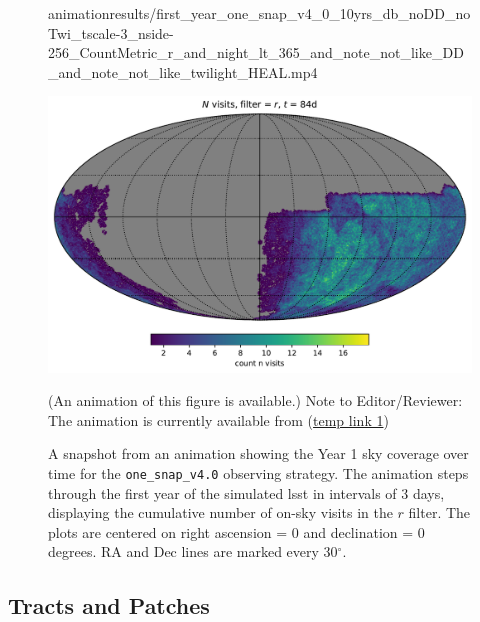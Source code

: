 \documentclass[preprintm,linenumbers]{aastex631}
\newcommand{\baseline}{\texttt{one\_snap\_v4.0}\xspace}
\begin{document}
 		
		\begin{figure}
			\begin{center}
				\begin{interactive}{animation}{results/first_year_one_snap_v4_0_10yrs_db_noDD_noTwi_tscale-3_nside-256_CountMetric_r_and_night_lt_365_and_note_not_like_DD_and_note_not_like_twilight_HEAL.mp4}
				\end{interactive}
				\includegraphics[width=0.5\columnwidth]{results/first_year_one_snap_v4_0_10yrs_db_noDD_noTwi_tscale-3_nside-256_CountMetric_r_and_night_lt_84_and_scheduler_note_not_like_DD_and_scheduler_note_not_like_twilight_HEAL.pdf}
				\caption{A snapshot from an animation showing the Year 1 sky coverage over time for the \baseline observing strategy. 
    The animation steps through the first year of the simulated \gls*{lsst} in intervals of 3 days, displaying the cumulative number of on-sky visits in the $r$ filter. 
    The plots are centered on right ascension = 0 and declination = 0 degrees. RA and Dec lines are marked every 30$^\circ$.} (An animation of this figure is available.)  Note to Editor/Reviewer: The animation is currently available from (\href{https://uoe-my.sharepoint.com/:v:/g/personal/jrobin10_ed_ac_uk/Ef0X-FVuKAhNtJtvRQiyPDMBi-5ypVqPowcvGSMqsr9PZw?nav=eyJyZWZlcnJhbEluZm8iOnsicmVmZXJyYWxBcHAiOiJPbmVEcml2ZUZvckJ1c2luZXNzIiwicmVmZXJyYWxBcHBQbGF0Zm9ybSI6IldlYiIsInJlZmVycmFsTW9kZSI6InZpZXciLCJyZWZlcnJhbFZpZXciOiJNeUZpbGVzTGlua0NvcHkifX0&e=ysWV8t}{temp link 1}) \label{animation:baseline}
			\end{center}
		\end{figure}
	
	
	
	
	\subsection{Tracts and Patches}
	\label{sec:tractsandpatches} 
	
\end{document}
